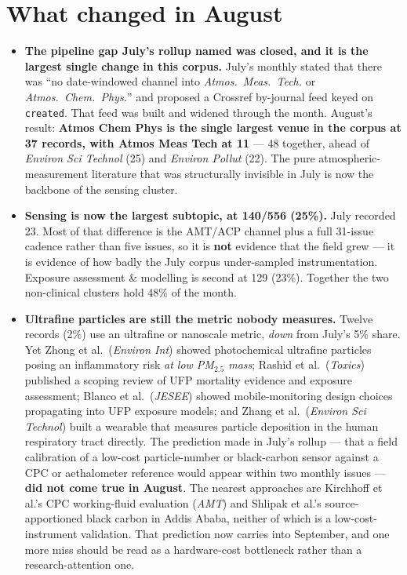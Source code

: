 \documentclass[10pt]{article}
\begin{document}
\vspace{3mm}

\section*{\sffamily\bfseries\color{Deep}What changed in August}
\vspace{-1.5mm}{\color{Coral}\rule{\linewidth}{1.1pt}}\vspace{2.5mm}

\footnotesize
\begin{itemize}
\item \textbf{The pipeline gap July's rollup named was closed, and it is the largest
single change in this corpus.} July's monthly stated that there was ``no date-windowed
channel into \textit{Atmos.\ Meas.\ Tech.} or \textit{Atmos.\ Chem.\ Phys.}'' and
proposed a Crossref by-journal feed keyed on \texttt{created}. That feed was built and
widened through the month. August's result: \textbf{Atmos Chem Phys is the single largest
venue in the corpus at 37 records, with Atmos Meas Tech at 11} --- 48 together, ahead of
\textit{Environ Sci Technol} (25) and \textit{Environ Pollut} (22). The pure
atmospheric-measurement literature that was structurally invisible in July is now the
backbone of the sensing cluster.

\item \textbf{Sensing is now the largest subtopic, at 140/556 (25\%).} July recorded 23.
Most of that difference is the AMT/ACP channel plus a full 31-issue cadence rather than
five issues, so it is \textbf{not} evidence that the field grew --- it is evidence of how
badly the July corpus under-sampled instrumentation. Exposure assessment \& modelling is
second at 129 (23\%). Together the two non-clinical clusters hold 48\% of the month.

\item \textbf{Ultrafine particles are still the metric nobody measures.} Twelve records
(2\%) use an ultrafine or nanoscale metric, \emph{down} from July's 5\% share. Yet Zhong
et al.\ (\textit{Environ Int}) showed photochemical ultrafine particles posing an
inflammatory risk \emph{at low PM$_{2.5}$ mass}; Rashid et al.\ (\textit{Toxics})
published a scoping review of UFP mortality evidence and exposure assessment; Blanco
et al.\ (\textit{JESEE}) showed mobile-monitoring design choices propagating into UFP
exposure models; and Zhang et al.\ (\textit{Environ Sci Technol}) built a wearable that
measures particle deposition in the human respiratory tract directly. The prediction
made in July's rollup --- that a field calibration of a low-cost particle-number or
black-carbon sensor against a CPC or aethalometer reference would appear within two
monthly issues --- \textbf{did not come true in August}. The nearest approaches are
Kirchhoff et al.'s CPC working-fluid evaluation (\textit{AMT}) and Shlipak et al.'s
source-apportioned black carbon in Addis Ababa, neither of which is a low-cost-instrument
validation. That prediction now carries into September, and one more miss should be read
as a hardware-cost bottleneck rather than a research-attention one.


\end{itemize}
\end{document}
